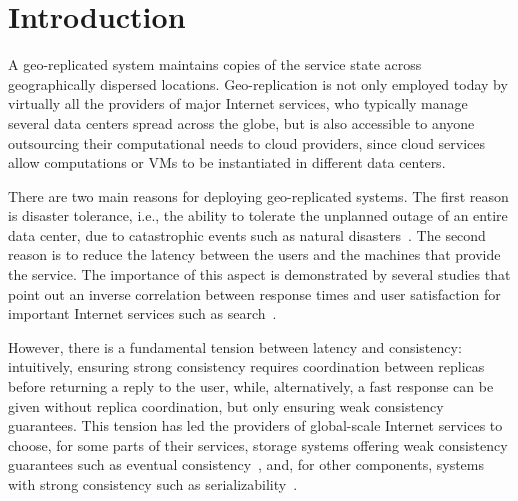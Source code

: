 \section{Introduction}

A geo-replicated system maintains copies of the service state across geographically dispersed locations.
Geo-replication is not only employed today by virtually all the providers of major Internet services, who typically manage several data centers spread across the globe, but is also accessible to anyone outsourcing their computational needs to cloud providers, since cloud services allow computations or VMs to be instantiated in different data centers.

There are two main reasons for deploying geo-replicated systems. The first reason is disaster tolerance, i.e., the ability to tolerate the unplanned outage of an entire data center, due to catastrophic events such as natural disasters~\cite{dc-outages}. The second reason is to reduce the latency between the users and the machines that provide the service. The importance of this aspect is demonstrated by several studies that point out an inverse correlation between response times and user satisfaction for important Internet services such as search~\cite{Schurman2009latency}.


However, there is a fundamental tension between latency and consistency: intuitively, ensuring strong consistency requires coordination between replicas before returning a reply to the user, while, alternatively, a fast response can be given without replica coordination, but only ensuring weak consistency guarantees. This tension has led the providers of global-scale Internet services to choose, for some parts of their services, storage systems offering weak consistency guarantees such as eventual consistency~\cite{dynamo}, and, for other components, systems with strong consistency such as serializability~\cite{Bernstein1987CCR}. 

